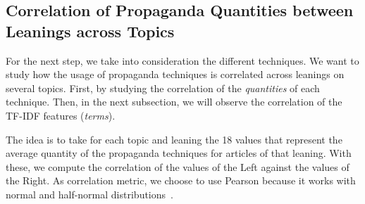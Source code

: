 \subsection{\statusgreen Correlation of Propaganda Quantities between Leanings across Topics}
\label{ssec:topic_propaganda_leaning_tech_quantities}




For the next step, we take into consideration the different techniques. We want to study how the usage of propaganda techniques is correlated across leanings on several topics.
%
First, by studying the correlation of the \emph{quantities} of each technique. Then, in the next subsection, we will observe the correlation of the TF-IDF features (\emph{terms}).

The idea is to take for each topic and leaning the 18 values that represent the average quantity of the propaganda techniques for articles of that leaning. With these, we compute the correlation of the values of the Left against the values of the Right.
%
As correlation metric, we choose to use Pearson because it works with normal and half-normal distributions~\cite{pearson1931analysis}.

